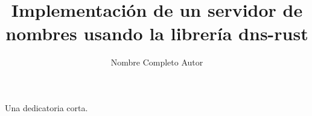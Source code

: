 \documentclass{umemoria}
\author{Nombre Completo Autor}
\title{Implementación de un servidor de nombres usando la librería dns-rust}
\begin{document}
\frontmatter
\maketitle

\begin{resumen}
\lipsum[1-4]
\end{resumen}


\begin{dedicatoria}
Una dedicatoria corta.
\end{dedicatoria}

\begin{thanks}
\lipsum[1-2]
\end{thanks}

\tableofcontents
\listoftables %
\listoffigures %

\mainmatter












\nocite{*}



\begin{appendices}

\end{appendices}
\end{document}
